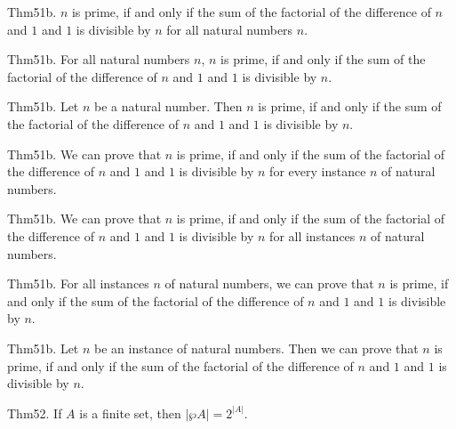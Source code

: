 \documentclass{article}
\begin{document}
Thm51b. $n$ is prime, if and only if the sum of the factorial of the difference of $n$ and $1$ and $1$ is divisible by $n$ for all natural numbers $n$.

Thm51b. For all natural numbers $n$, $n$ is prime, if and only if the sum of the factorial of the difference of $n$ and $1$ and $1$ is divisible by $n$.

Thm51b. Let $n$ be a natural number. Then $n$ is prime, if and only if the sum of the factorial of the difference of $n$ and $1$ and $1$ is divisible by $n$.

Thm51b. We can prove that $n$ is prime, if and only if the sum of the factorial of the difference of $n$ and $1$ and $1$ is divisible by $n$ for every instance $n$ of natural numbers.

Thm51b. We can prove that $n$ is prime, if and only if the sum of the factorial of the difference of $n$ and $1$ and $1$ is divisible by $n$ for all instances $n$ of natural numbers.

Thm51b. For all instances $n$ of natural numbers, we can prove that $n$ is prime, if and only if the sum of the factorial of the difference of $n$ and $1$ and $1$ is divisible by $n$.

Thm51b. Let $n$ be an instance of natural numbers. Then we can prove that $n$ is prime, if and only if the sum of the factorial of the difference of $n$ and $1$ and $1$ is divisible by $n$.

Thm52. If $A$ is a finite set, then $| \wp A | = 2 ^ {| A |}$.
\end{document}
